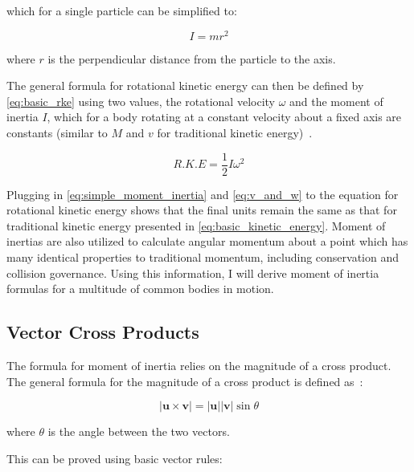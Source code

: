 which for a single particle can be simplified to:

\begin{equation}
I = mr^2
\label{eq:simple_moment_inertia}
\end{equation}

where $r$ is the perpendicular distance from the particle to the axis.

The general formula for rotational kinetic energy can then be defined by \cref{eq:basic_rke} using two values, the rotational velocity $\omega$ and the moment of inertia $I$, which for a body rotating at a constant velocity about a fixed axis are constants (similar to $M$ and $v$ for traditional kinetic energy)~\parencite{Young_Freedman_Young_2020}.

\begin{equation}
R.K.E = \frac{1}{2}I\omega^2
\label{eq:basic_rke}
\end{equation}

Plugging in \cref{eq:simple_moment_inertia} and \cref{eq:v_and_w} to the equation for rotational kinetic energy shows that the final units remain the same as that for traditional kinetic energy presented in \cref{eq:basic_kinetic_energy}. Moment of inertias are also utilized to calculate angular momentum about a point which has many identical properties to traditional momentum, including conservation and collision governance. Using this information, I will derive moment of inertia formulas for a multitude of common bodies in motion.

\subsection{Vector Cross Products}

The formula for moment of inertia relies on the magnitude of a cross product. The general formula for the magnitude of a cross product is defined as~\parencite{Hass_Heil_Weir_2018}:

\begin{equation}
|\bm{u} \times \bm{v}| = |\bm{u}||\bm{v}|\sin{\theta}
\label{eq:cross_product}
\end{equation}

where $\theta$ is the angle between the two vectors.

This can be proved using basic vector rules:

